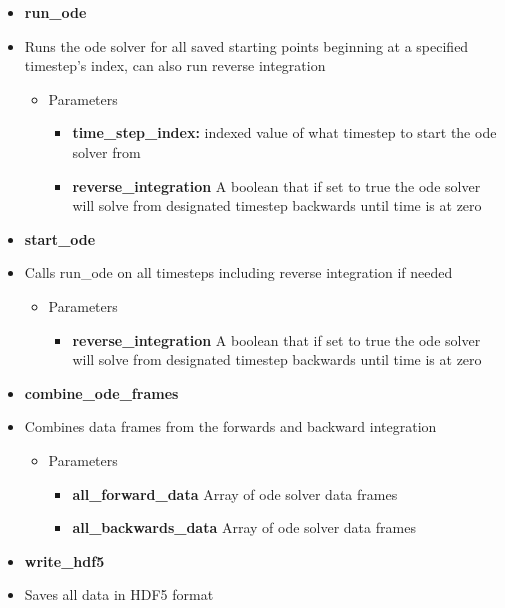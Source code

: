 \begin{itemize}
    \item \textbf{run\_ode}
    \item[] Runs the ode solver for all saved starting points beginning at a specified timestep's index, can also run reverse integration
    \begin{itemize}    
    \item Parameters   
        \begin{itemize}
        \item\textbf{time\_step\_index:} indexed value of what timestep to start the ode solver from
        \item\textbf{reverse\_integration} A boolean that if set to true the ode solver will solve from designated timestep backwards until time is at zero
        \end{itemize} 
    \end{itemize}   

    \item \textbf{start\_ode}
    \item[] Calls run\_ode on all timesteps including reverse integration if needed 
    
    \begin{itemize}    
    \item Parameters   
        \begin{itemize}
        \item\textbf{reverse\_integration} A boolean that if set to true the ode solver will solve from designated timestep backwards until time is at zero
        \end{itemize} 
    \end{itemize}   
    
    
    \item \textbf{combine\_ode\_frames}
    \item[] Combines data frames from the forwards and backward integration
    
        \begin{itemize}    
        \item Parameters   
            \begin{itemize}
            \item\textbf{all\_forward\_data} Array of ode solver data frames 
            \item\textbf{all\_backwards\_data} Array of ode solver data frames
            \end{itemize} 
        \end{itemize}   


    \item \textbf{write\_hdf5}
    \item[] Saves all data in HDF5 format
    

\end{itemize}

